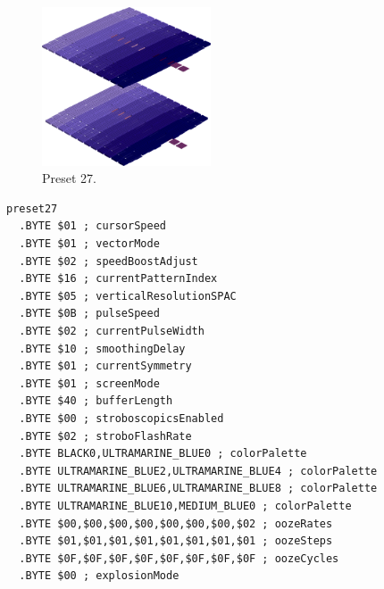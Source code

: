 \clearpage
\begin{minipage}[b]{0.48\linewidth}
\begin{figure}[H]                                                          
  \centering                                                             
  \begin{adjustbox}{width=5cm,center}                                   
  \includegraphics[width=5cm]{src/colorspace_presets/preset27-45.png}%
  \end{adjustbox}                                                        
\caption*{Preset 27.}                                           
\end{figure}                                                               
\end{minipage}
\hspace{0.1cm}
\begin{minipage}[b]{0.48\linewidth}                            
\begin{lstlisting}[basicstyle=\ttfamily\tiny]
preset27
  .BYTE $01 ; cursorSpeed
  .BYTE $01 ; vectorMode
  .BYTE $02 ; speedBoostAdjust
  .BYTE $16 ; currentPatternIndex
  .BYTE $05 ; verticalResolutionSPAC
  .BYTE $0B ; pulseSpeed
  .BYTE $02 ; currentPulseWidth
  .BYTE $10 ; smoothingDelay
  .BYTE $01 ; currentSymmetry
  .BYTE $01 ; screenMode
  .BYTE $40 ; bufferLength
  .BYTE $00 ; stroboscopicsEnabled
  .BYTE $02 ; stroboFlashRate
  .BYTE BLACK0,ULTRAMARINE_BLUE0 ; colorPalette
  .BYTE ULTRAMARINE_BLUE2,ULTRAMARINE_BLUE4 ; colorPalette
  .BYTE ULTRAMARINE_BLUE6,ULTRAMARINE_BLUE8 ; colorPalette
  .BYTE ULTRAMARINE_BLUE10,MEDIUM_BLUE0 ; colorPalette
  .BYTE $00,$00,$00,$00,$00,$00,$00,$02 ; oozeRates
  .BYTE $01,$01,$01,$01,$01,$01,$01,$01 ; oozeSteps
  .BYTE $0F,$0F,$0F,$0F,$0F,$0F,$0F,$0F ; oozeCycles
  .BYTE $00 ; explosionMode
\end{lstlisting}
\end{minipage}

\vspace*{-0.5cm}

